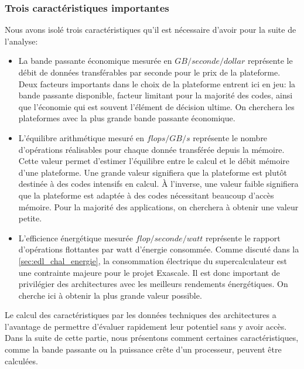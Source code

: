     

    
    \subsubsection{Trois caractéristiques importantes}

        Nous avons isolé trois caractéristiques qu'il est nécessaire d'avoir pour la suite de l'analyse:
        \begin{itemize}
            \item La bande passante économique mesurée en $GB/seconde/dollar$ représente le débit de données transférables par seconde pour le prix de la plateforme. Deux facteurs importants dans le choix de la plateforme entrent ici en jeu: la bande passante disponible, facteur limitant pour la majorité des codes, ainsi que l'économie qui est souvent l'élément de décision ultime. On cherchera les plateformes avec la plus grande bande passante économique.
            \item L'équilibre arithmétique mesuré en $flops/GB/s$ représente le nombre d'opérations réalisables pour chaque donnée transférée  depuis la mémoire. Cette valeur permet d'estimer l'équilibre entre le calcul et le débit mémoire d'une plateforme. Une grande valeur signifiera que la plateforme est plutôt destinée à des codes intensifs en calcul. À l'inverse, une valeur faible signifiera que la plateforme est adaptée à des codes nécessitant beaucoup d'accès mémoire. Pour la majorité des applications, on cherchera à obtenir une valeur petite.
            \item L'efficience énergétique mesurée $flop/seconde/watt$ représente le rapport d'opérations flottantes par watt d'énergie consommée. Comme discuté dans la \autoref{sec:edl_chal_energie}, la consommation électrique du supercalculateur est une contrainte majeure pour le projet Exascale. Il est donc important de privilégier des architectures avec les meilleurs rendements énergétiques. On cherche ici à obtenir la plus grande valeur possible.
        \end{itemize}
            
    Le calcul des caractéristiques par les données techniques des architectures a l'avantage de permettre d'évaluer rapidement leur potentiel sans y avoir accès. Dans la suite de cette partie, nous présentons comment certaines caractéristiques, comme la bande passante ou la puissance crête d'un processeur, peuvent être calculées.
    

